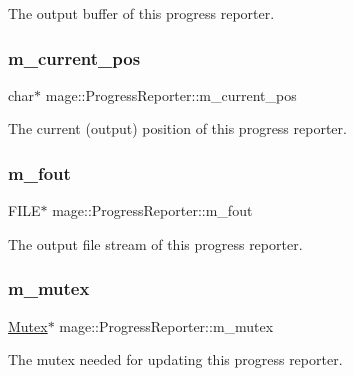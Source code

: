 The output buffer of this progress reporter. \hypertarget{classmage_1_1_progress_reporter_a7adafaaf90edf29c8c27f4008aea41c9}{}\label{classmage_1_1_progress_reporter_a7adafaaf90edf29c8c27f4008aea41c9} 
\subsubsection{\texorpdfstring{m\+\_\+current\+\_\+pos}{m\_current\_pos}}
{\footnotesize\ttfamily char$\ast$ mage\+::\+Progress\+Reporter\+::m\+\_\+current\+\_\+pos\hspace{0.3cm}{\ttfamily [protected]}}

The current (output) position of this progress reporter. \hypertarget{classmage_1_1_progress_reporter_ad325ee5978fd1d16a97acbe37a977982}{}\label{classmage_1_1_progress_reporter_ad325ee5978fd1d16a97acbe37a977982} 
\subsubsection{\texorpdfstring{m\+\_\+fout}{m\_fout}}
{\footnotesize\ttfamily F\+I\+LE$\ast$ mage\+::\+Progress\+Reporter\+::m\+\_\+fout\hspace{0.3cm}{\ttfamily [protected]}}

The output file stream of this progress reporter. \hypertarget{classmage_1_1_progress_reporter_abda37942e51b682b2871e49883d58da1}{}\label{classmage_1_1_progress_reporter_abda37942e51b682b2871e49883d58da1} 
\subsubsection{\texorpdfstring{m\+\_\+mutex}{m\_mutex}}
{\footnotesize\ttfamily \hyperlink{classmage_1_1_mutex}{Mutex}$\ast$ mage\+::\+Progress\+Reporter\+::m\+\_\+mutex\hspace{0.3cm}{\ttfamily [protected]}}

The mutex needed for updating this progress reporter. \hypertarget{classmage_1_1_progress_reporter_a17d7a4f8b2c8a6de255786f6165726bd}{}\label{classmage_1_1_progress_reporter_a17d7a4f8b2c8a6de255786f6165726bd} 
